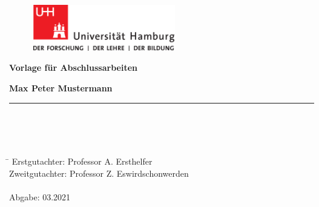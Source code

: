 \begin{titlepage}

  \setcounter{page}{-1}

	\begin{figure}[h]
		\begin{minipage}[b]{62mm}
			\includegraphics[width=62mm]{images/unilogo}
		\end{minipage}
		\hspace{4cm}
	\end{figure}

	\vfill
	
	\begin{center}
		\vspace{14mm}
		\noindent \textbf{\huge
		  Vorlage für Abschlussarbeiten
		}
		\vspace{60mm}	
	\end{center}
	
	\vfill
	
	\noindent \textbf{Max Peter Mustermann} \\
	\noindent \rule{\textwidth}{0.4mm} 
	 \\
	 \\
	 \\
	\begin{tabbing}
	\hspace{8em} \=  \kill
	Erstgutachter: \> Professor A. Ersthelfer \\
	Zweitgutachter: \> Professor Z. Eswirdschonwerden \\
	~ \\
	Abgabe: 03.2021
	\end{tabbing}

\end{titlepage}

